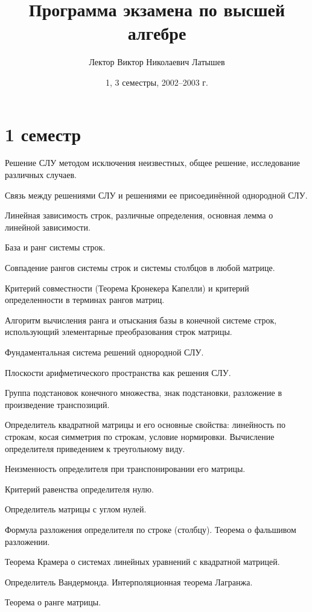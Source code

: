 \documentclass[a4paper]{article}
\title{Программа экзамена по высшей алгебре}
\author{Лектор Виктор Николаевич Латышев}
\date{1, 3 семестры, 2002--2003 г.}
\begin{document}
\maketitle

\section*{1 семестр}

\begin{nums}{-2}
\item Решение СЛУ методом исключения неизвестных, общее решение,
исследование различных случаев.
\item Связь между решениями СЛУ и решениями ее присоединённой однородной СЛУ.
\item Линейная зависимость строк, различные определения, основная лемма о линейной зависимости.
\item База и ранг системы строк.
\item Совпадение рангов системы строк и системы столбцов в любой матрице.
\item Критерий совместности (Теорема Кронекера Капелли) и критерий определенности в терминах
рангов матриц.
\item Алгоритм вычисления ранга и отыскания базы в конечной системе строк, использующий
элементарные преобразования строк матрицы.
\item Фундаментальная система решений однородной СЛУ.
\item Плоскости арифметического пространства как решения СЛУ.
\item Группа подстановок конечного множества, знак подстановки, разложение в произведение
транспозиций.
\item Определитель квадратной матрицы и его основные свойства: линейность по строкам, косая
симметрия по строкам, условие нормировки. Вычисление определителя приведением к треугольному виду.
\item Неизменность определителя при транспонировании его матрицы.
\item Критерий равенства определителя нулю.
\item Определитель матрицы с углом нулей.
\item Формула разложения определителя по строке (столбцу). Теорема о фальшивом разложении.
\item Теорема Крамера о системах линейных уравнений с квадратной матрицей.
\item Определитель Вандермонда. Интерполяционная теорема Лагранжа.
\item Теорема о ранге матрицы.

\end{nums}
\end{document}
